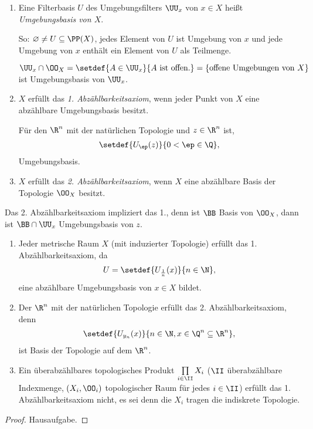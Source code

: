 \begin{defn}
\label{defn:2.1.13}
\begin{enumerate}
  \item Eine Filterbasis $U$ des Umgebungsfilters $\UU_x$ von $x\in X$ heißt
  \emph{Umgebungsbasis von $X$}.
  
  So: $\varnothing\neq U\subseteq \PP(X)$, jedes Element von $U$ ist Umgebung
  von $x$ und jede Umgebung von $x$ enthält ein Element von $U$ als Teilmenge.
  \begin{bspn}
  $\UU_x\cap \OO_X = \setdef{A\in \UU_x}{A \text{ ist offen}.} = \{\text{offene
  Umgebungen von }X\}$ ist Umgebungsbasis von $\UU_x$.\bsphere
  \end{bspn}
  \item $X$ erfüllt das \emph{1. Abzählbarkeitsaxiom}, wenn jeder Punkt von $X$
  eine abzählbare Umgebungsbasis besitzt.
  
  \begin{bspn}
  Für den $\R^n$ mit der natürlichen Topologie und $z\in\R^n$ ist,
  \begin{align*}
  \setdef{U_\ep(z)}{0<\ep\in\Q},
  \end{align*}
  Umgebungsbasis.\bsphere
  \end{bspn}
  \item $X$ erfüllt das \emph{2. Abzählbarkeitsaxiom}, wenn $X$ eine abzählbare
  Basis der Topologie $\OO_X$ besitzt.\fishhere
\end{enumerate}
\end{defn}

\begin{bemn}
Das 2. Abzählbarkeitsaxiom impliziert das 1., denn ist $\BB$ Basis von $\OO_X$,
dann ist $\BB\cap\UU_x$ Umgebungsbasis von $z$.
\end{bemn}

\begin{bsp}
\label{bsp:2.1.14}
\begin{enumerate}
  \item Jeder metrische Raum $X$ (mit induzierter Topologie) erfüllt das 1.
  Abzählbarkeitsaxiom, da
  \begin{align*}
  U = \setdef{U_{\frac{1}{n}}(x)}{n\in\N},
  \end{align*}
  eine abzählbare Umgebungsbasis von $x\in X$ bildet.
  \item Der $\R^n$ mit der natürlichen Topologie erfüllt das 2.
  Abzählbarkeitsaxiom, denn
  \begin{align*}
  \setdef{U_{y_n}(x)}{n\in\N, x\in\Q^n\subseteq \R^n},
  \end{align*}
  ist Basis der Topologie auf dem $\R^n$.
  \item
  Ein überabzählbares topologisches Produkt $\prod\limits_{i\in\II} X_i$ ($\II$
  überabzählbare Indexmenge, $(X_i,\OO_i)$ topologischer Raum für jedes
  $i\in\II$) erfüllt das 1. Abzählbarkeitsaxiom nicht, es sei denn die 
  $X_i$ tragen die indiskrete Topologie.\bsphere
\end{enumerate}
\end{bsp}
\begin{proof}
Hausaufgabe.\qedhere
\end{proof}

